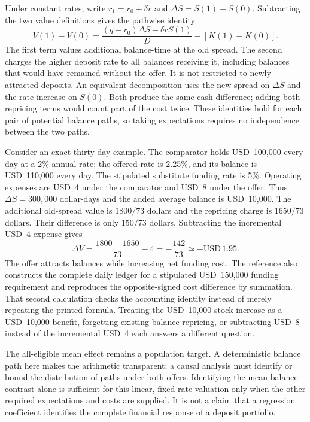 Under constant rates, write $r_1=r_0+\delta r$ and
$\Delta S=S(1)-S(0)$. Subtracting the two value definitions gives the
pathwise identity
\begin{equation}
 V(1)-V(0)=\frac{(q-r_0)\Delta S-\delta r S(1)}D
             -[K(1)-K(0)].
 \label{exec17:l2-decomposition}
\end{equation}
The first term values additional balance-time at the old spread. The second
charges the higher deposit rate to all balances receiving it, including
balances that would have remained without the offer. It is not restricted
to newly attracted deposits. An equivalent decomposition uses the new
spread on $\Delta S$ and the rate increase on $S(0)$. Both produce the same
cash difference; adding both repricing terms would count part of the cost
twice. These identities hold for each pair of potential balance paths, so
taking expectations requires no independence between the two paths.

Consider an exact thirty-day example. The comparator holds USD~100,000 every
day at a 2\% annual rate; the offered rate is 2.25\%, and its balance is
USD~110,000 every day. The stipulated substitute funding rate is 5\%.
Operating expenses are USD~4 under the comparator and USD~8 under the offer.
Thus $\Delta S=300{,}000$ dollar-days and the added average balance is
USD~10,000. The additional old-spread value is $1800/73$ dollars and the
repricing charge is $1650/73$ dollars. Their difference is only $150/73$
dollars. Subtracting the incremental USD~4 expense gives
\begin{equation}
 \Delta V=\frac{1800-1650}{73}-4=-\frac{142}{73}
          \simeq -\mathrm{USD}\,1.95.
 \label{exec17:l2-numeric}
\end{equation}
The offer attracts balances while increasing net funding cost. The reference
also constructs the complete daily ledger for a stipulated USD~150,000 funding
requirement and reproduces the opposite-signed cost difference by summation.
That second calculation checks the accounting identity instead of merely
repeating the printed formula. Treating the USD~10,000 stock increase as a
USD~10,000 benefit, forgetting existing-balance repricing, or subtracting
USD~8 instead of the incremental USD~4 each answers a different question.

The all-eligible mean effect remains a population target. A deterministic
balance path here makes the arithmetic transparent; a causal analysis must
identify or bound the distribution of paths under both offers. Identifying
the mean balance contrast alone is sufficient for this linear, fixed-rate
valuation only when the other required expectations and costs are supplied.
It is not a claim that a regression coefficient identifies the complete
financial response of a deposit portfolio.

